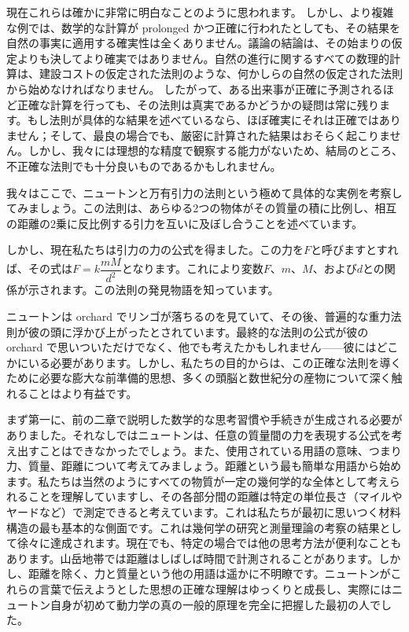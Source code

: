 \documentclass[a4paper,11pt,openany]{ltjsbook}
\begin{document}
現在これらは確かに非常に明白なことのように思われます。
しかし、より複雑な例では、数学的な計算が prolonged かつ正確に行われたとしても、その結果を自然の事実に適用する確実性は全くありません。議論の結論は、その始まりの仮定よりも決してより確実ではありません。自然の進行に関するすべての数理的計算は、建設コストの仮定された法則のような、何かしらの自然の仮定された法則から始めなければなりません。
したがって、ある出来事が正確に予測されるほど正確な計算を行っても、その法則は真実であるかどうかの疑問は常に残ります。もし法則が具体的な結果を述べているなら、ほぼ確実にそれは正確ではありません；そして、最良の場合でも、厳密に計算された結果はおそらく起こりません。しかし、我々には理想的な精度で観察する能力がないため、結局のところ、不正確な法則でも十分良いものであるかもしれません。

我々はここで、ニュートンと万有引力の法則という極めて具体的な実例を考察してみましょう。この法則は、あらゆる2つの物体がその質量の積に比例し、相互の距離の2乗に反比例する引力を互いに及ぼし合うことを述べています。

しかし、現在私たちは引力の力の公式を得ました。この力を$F$と呼びますとすれば、その式は$F = k\dfrac{mM}{d^{2}}$となります。これにより変数$F$、$m$、$M$、および$d$との関係が示されます。この法則の発見物語を知っています。

ニュートンは orchard でリンゴが落ちるのを見ていて、その後、普遍的な重力法則が彼の頭に浮かび上がったとされています。最終的な法則の公式が彼の orchard で思いついただけでなく、他でも考えたかもしれません——彼にはどこかにいる必要があります。しかし、私たちの目的からは、この正確な法則を導くために必要な膨大な前準備的思想、多くの頭脳と数世紀分の産物について深く触れることはより有益です。

まず第一に、前の二章で説明した数学的な思考習慣や手続きが生成される必要がありました。それなしではニュートンは、任意の質量間の力を表現する公式を考え出すことはできなかったでしょう。また、使用されている用語の意味、つまり力、質量、距離について考えてみましょう。距離という最も簡単な用語から始めます。私たちは当然のようにすべての物質が一定の幾何学的な全体として考えられることを理解していますし、その各部分間の距離は特定の単位長さ（マイルやヤードなど）で測定できると考えています。これは私たちが最初に思いつく材料構造の最も基本的な側面です。これは幾何学の研究と測量理論の考察の結果として徐々に達成されます。現在でも、特定の場合では他の思考方法が便利なこともあります。山岳地帯では距離はしばしば時間で計測されることがあります。しかし、距離を除く、力と質量という他の用語は遥かに不明瞭です。ニュートンがこれらの言葉で伝えようとした思想の正確な理解はゆっくりと成長し、実際にはニュートン自身が初めて動力学の真の一般的原理を完全に把握した最初の人でした。
\end{document}
